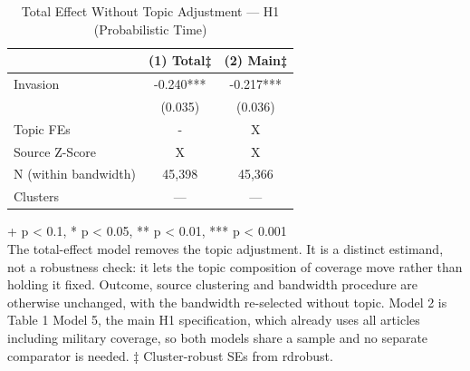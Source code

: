 \begin{table}[t]
\caption{\label{tab:s14a}Total Effect Without Topic Adjustment — H1 (Probabilistic Time)}
\fontsize{12.0pt}{14.0pt}\selectfont
\begin{tabular*}{\linewidth}{@{\extracolsep{\fill}}lcc}
\toprule
  & (1) Total‡ & (2) Main‡ \\ 
\midrule\addlinespace[2.5pt]
Invasion & -0.240*** & -0.217*** \\ 
 & (0.035) & (0.036) \\ 
Topic FEs & - & X \\ 
Source Z-Score & X & X \\ 
N (within bandwidth) & 45,398 & 45,366 \\ 
Clusters & — & — \\ 
\bottomrule
\end{tabular*}
\begin{minipage}{\linewidth}
\vspace{.05em}
+ p < 0.1, * p < 0.05, ** p < 0.01, *** p < 0.001\\
The total-effect model removes the topic adjustment. It is a distinct estimand,
not a robustness check: it lets the topic composition of coverage move rather
than holding it fixed. Outcome, source clustering and bandwidth procedure are
otherwise unchanged, with the bandwidth re-selected without topic. Model 2 is
Table 1 Model 5, the main H1 specification, which already uses all articles
including military coverage, so both models share a sample and no separate
comparator is needed. ‡ Cluster-robust SEs from rdrobust.\\
\end{minipage}
\end{table}

